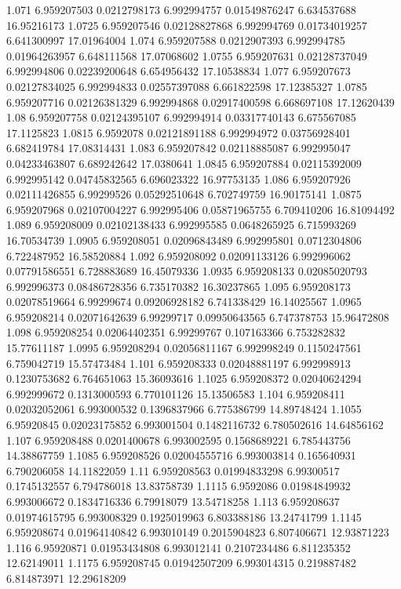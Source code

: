 {1.071 6.959207503 0.0212798173 6.992994757 0.01549876247 6.634537688 16.95216173
1.0725 6.959207546 0.02128827868 6.992994769 0.01734019257 6.641300997 17.01964004
1.074 6.959207588 0.0212907393 6.992994785 0.01964263957 6.648111568 17.07068602
1.0755 6.959207631 0.02128737049 6.992994806 0.02239200648 6.654956432 17.10538834
1.077 6.959207673 0.02127834025 6.992994833 0.02557397088 6.661822598 17.12385327
1.0785 6.959207716 0.02126381329 6.992994868 0.02917400598 6.668697108 17.12620439
1.08 6.959207758 0.02124395107 6.992994914 0.03317740143 6.675567085 17.1125823
1.0815 6.9592078 0.02121891188 6.992994972 0.03756928401 6.682419784 17.08314431
1.083 6.959207842 0.02118885087 6.992995047 0.04233463807 6.689242642 17.0380641
1.0845 6.959207884 0.02115392009 6.992995142 0.04745832565 6.696023322 16.97753135
1.086 6.959207926 0.02111426855 6.99299526 0.05292510648 6.702749759 16.90175141
1.0875 6.959207968 0.02107004227 6.992995406 0.05871965755 6.709410206 16.81094492
1.089 6.959208009 0.02102138433 6.992995585 0.0648265925 6.715993269 16.70534739
1.0905 6.959208051 0.02096843489 6.992995801 0.0712304806 6.722487952 16.58520884
1.092 6.959208092 0.02091133126 6.992996062 0.07791586551 6.728883689 16.45079336
1.0935 6.959208133 0.02085020793 6.992996373 0.08486728356 6.735170382 16.30237865
1.095 6.959208173 0.02078519664 6.99299674 0.09206928182 6.741338429 16.14025567
1.0965 6.959208214 0.02071642639 6.99299717 0.09950643565 6.747378753 15.96472808
1.098 6.959208254 0.02064402351 6.99299767 0.107163366 6.753282832 15.77611187
1.0995 6.959208294 0.02056811167 6.992998249 0.1150247561 6.759042719 15.57473484
1.101 6.959208333 0.02048881197 6.992998913 0.1230753682 6.764651063 15.36093616
1.1025 6.959208372 0.02040624294 6.992999672 0.1313000593 6.770101126 15.13506583
1.104 6.959208411 0.02032052061 6.993000532 0.1396837966 6.775386799 14.89748424
1.1055 6.95920845 0.02023175852 6.993001504 0.1482116732 6.780502616 14.64856162
1.107 6.959208488 0.0201400678 6.993002595 0.1568689221 6.785443756 14.38867759
1.1085 6.959208526 0.02004555716 6.993003814 0.165640931 6.790206058 14.11822059
1.11 6.959208563 0.01994833298 6.99300517 0.1745132557 6.794786018 13.83758739
1.1115 6.9592086 0.01984849932 6.993006672 0.1834716336 6.79918079 13.54718258
1.113 6.959208637 0.01974615795 6.993008329 0.1925019963 6.803388186 13.24741799
1.1145 6.959208674 0.01964140842 6.993010149 0.2015904823 6.807406671 12.93871223
1.116 6.95920871 0.01953434808 6.993012141 0.2107234486 6.811235352 12.62149011
1.1175 6.959208745 0.01942507209 6.993014315 0.219887482 6.814873971 12.29618209
}
